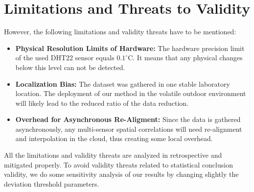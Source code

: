 \section{Limitations and Threats to Validity}
\label{sec:validity}
However, the following limitations and validity threats have to be mentioned:
\begin{itemize}
    \item \textbf{Physical Resolution Limits of Hardware:} The hardware precision limit of the used DHT22 sensor equals $0.1^\circ$C. It means that any physical changes below this level can not be detected.
    \item \textbf{Localization Bias:} The dataset was gathered in one stable laboratory location. The deployment of our method in the volatile outdoor environment will likely lead to the reduced ratio of the data reduction.
    \item \textbf{Overhead for Asynchronous Re-Aligment:} Since the data is gathered asynchronously, any multi-sensor spatial correlations will need re-alignment and interpolation in the cloud, thus creating some local overhead.
\end{itemize}

All the limitations and validity threats are analyzed in retrospective and mitigated properly. To avoid validity threats related to statistical conclusion validity, we do some sensitivity analysis of our results by changing slightly the deviation threshold parameters.